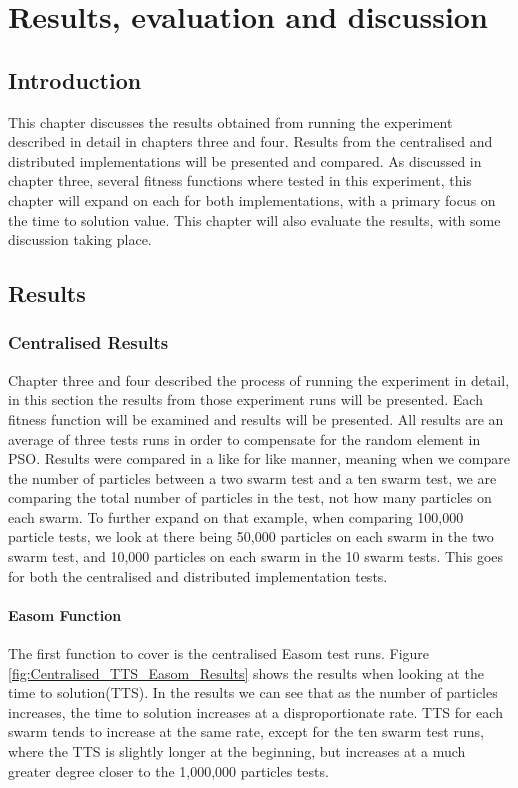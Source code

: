 \documentclass[oneside,12pt]{book}
\begin{document}
\chapter{Results, evaluation and discussion}
\section{Introduction}
This chapter discusses the results obtained from running the experiment described in detail in chapters three and four. Results from the centralised and distributed implementations will be presented and compared. As discussed in chapter three, several fitness functions where tested in this experiment, this chapter will expand on each for both implementations, with a primary focus on the time to solution value. This chapter will also evaluate the results, with some discussion taking place. 

\section{Results}
\subsection{Centralised Results}
Chapter three and four described the process of running the experiment in detail, in this section the results from those experiment runs will be presented. Each fitness function will be examined and results will be presented. All results are an average of three tests runs in order to compensate for the random element in PSO. Results were compared in a like for like manner, meaning when we compare the number of particles between a two swarm test and a ten swarm test, we are comparing the total number of particles in the test, not how many particles on each swarm. To further expand on that example, when comparing 100,000 particle tests, we look at there being 50,000 particles on each swarm in the two swarm test, and 10,000 particles on each swarm in the 10 swarm tests. This goes for both the centralised and distributed implementation tests. 

\subsubsection{Easom Function}
The first function to cover is the centralised Easom test runs. Figure \ref{fig:Centralised_TTS_Easom_Results} shows the results when looking at the time to solution(TTS). In the results we can see that as the number of particles increases, the time to solution increases at a disproportionate rate. TTS for each swarm tends to increase at the same rate, except for the ten swarm test runs, where the TTS is slightly longer at the beginning, but increases at a much greater degree closer to the 1,000,000 particles tests.
\end{document}
